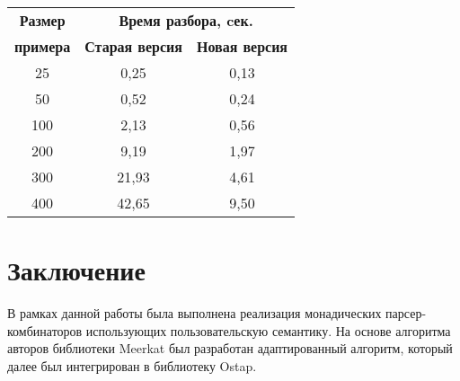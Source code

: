 \documentclass[conference]{IEEEtran}
\begin{document}
\begin{table}[htbp]
\begin{center}
\begin{tabular}{|c|c|c|}
\hline
\textbf{Размер} & \multicolumn{2}{|c|}{\textbf{Время разбора, cек.}} \\
\cline{2-3}
\textbf{примера} & \textbf{Старая версия} & \textbf{Новая версия} \\
\hline
25& 0,25& 0,13 \\
\hline
50& 0,52& 0,24 \\
\hline
100& 2,13& 0,56 \\
\hline
200& 9,19& 1,97 \\
\hline
300& 21,93& 4,61 \\
\hline
400& 42,65& 9,50 \\
\hline
\end{tabular}
\vskip3mm
\label{tab1}
\end{center}\vspace{-10mm}
\end{table}


\section{Заключение}

В рамках данной работы была выполнена реализация монадических парсер-комбинаторов использующих пользовательскую семантику. На основе алгоритма авторов библиотеки Meerkat был
разработан адаптированный алгоритм, который далее был интегрирован в библиотеку Ostap.
\end{document}
